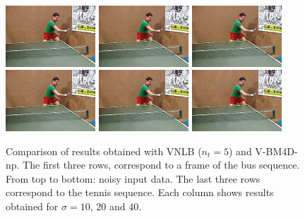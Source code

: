 \documentclass{llncs}
\begin{document}
\begin{figure}[thpb!]
\begin{center}
		\includegraphics[trim=3.5cm 2cm 1.5cm .5cm, clip=true, width=0.3\textwidth]{figs/tennis_vnlb_s10_tr2_140.png}
		\includegraphics[trim=3.5cm 2cm 1.5cm .5cm, clip=true, width=0.3\textwidth]{figs/tennis_vnlb_s20_tr2_140.png}
		\includegraphics[trim=3.5cm 2cm 1.5cm .5cm, clip=true, width=0.3\textwidth]{figs/tennis_vnlb_s40_tr2_140.png}\\
		\includegraphics[trim=3.5cm 2cm 1.5cm .5cm, clip=true, width=0.3\textwidth]{figs/tennis_s10_bm4d_140.png}
		\includegraphics[trim=3.5cm 2cm 1.5cm .5cm, clip=true, width=0.3\textwidth]{figs/tennis_s20_bm4d_140.png}
		\includegraphics[trim=3.5cm 2cm 1.5cm .5cm, clip=true, width=0.3\textwidth]{figs/tennis_s40_bm4d_140.png}
	\end{center}
	\caption{Comparison of results obtained with VNLB ($n_t =5$) and V-BM4D-np.
	The first three rows, correspond to a frame of the bus sequence. From top to
	bottom: noisy input data. The last three rows correspond to the tennis sequence.
	Each column shows results obtained for $\sigma = 10$, $20$ and $40$.}
	\label{fig:results}
\end{figure}
\end{document}

